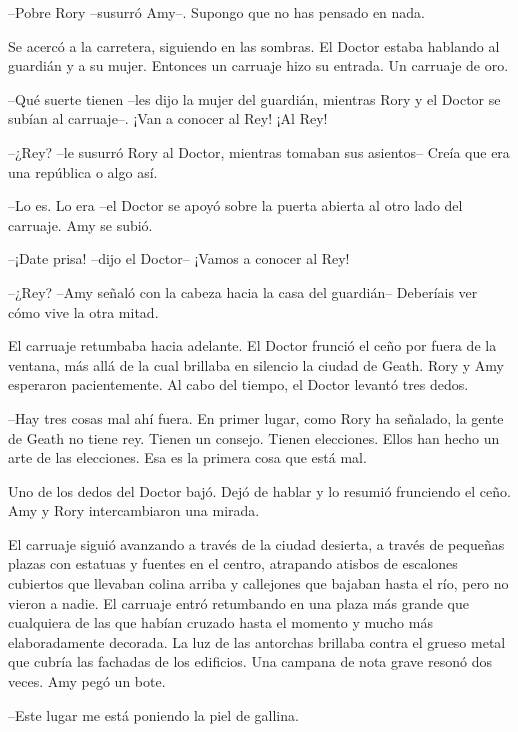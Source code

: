 {--Pobre Rory --susurró Amy--. Supongo que no has pensado en nada.}

{Se acercó a la carretera, siguiendo en las sombras. El Doctor estaba
	hablando al guardián y a su mujer. Entonces un carruaje hizo su entrada.
Un carruaje de oro.}

{--Qué suerte tienen --les dijo la mujer del guardián, mientras Rory y
el Doctor se subían al carruaje--. ¡Van a conocer al Rey! ¡Al Rey!}

{--¿Rey? --le susurró Rory al Doctor, mientras tomaban sus asientos--
Creía que era una república o algo así.}

{--Lo es. Lo era --el Doctor se apoyó sobre la puerta abierta al otro
lado del carruaje. Amy se subió.}

{--¡Date prisa! --dijo el Doctor-- ¡Vamos a conocer al Rey!}

{--¿Rey? --Amy señaló con la cabeza hacia la casa del guardián--
Deberíais ver cómo vive la otra mitad.}

{El carruaje retumbaba hacia adelante. El Doctor frunció el ceño por
	fuera de la ventana, más allá de la cual brillaba en silencio la ciudad
	de Geath. Rory y Amy esperaron pacientemente. Al cabo del tiempo, el
Doctor levantó tres dedos.}

{--Hay tres cosas mal ahí fuera. En primer lugar, como Rory ha
	señalado, la gente de Geath no tiene rey. Tienen un consejo. Tienen
	elecciones. Ellos han hecho un arte de las elecciones. Esa es la primera
cosa que está mal.}

{Uno de los dedos del Doctor bajó. Dejó de hablar y lo resumió
frunciendo el ceño. Amy y Rory intercambiaron una mirada.}

{El carruaje siguió avanzando a través de la ciudad desierta, a través
	de pequeñas plazas con estatuas y fuentes en el centro, atrapando
	atisbos de escalones cubiertos que llevaban colina arriba y callejones
	que bajaban hasta el río, pero no vieron a nadie. El carruaje entró
	retumbando en una plaza más grande que cualquiera de las que habían
	cruzado hasta el momento y mucho más elaboradamente decorada. La luz de
	las antorchas brillaba contra el grueso metal que cubría las fachadas de
	los edificios. Una campana de nota grave resonó dos veces. Amy pegó un
bote.}

{--Este lugar me está poniendo la piel de gallina.}

